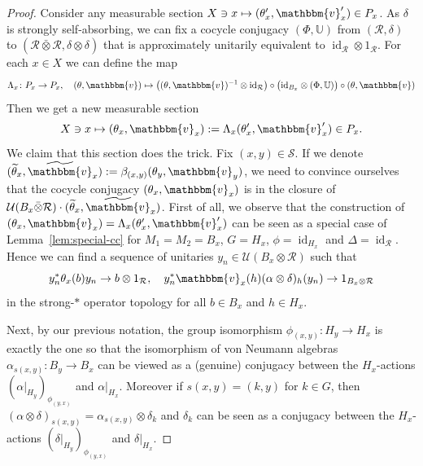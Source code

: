 \documentclass[11pt,a4paper]{article}
\theoremstyle{definition}
\theoremstyle{remark}
\numberwithin{equation}{section}
\numberwithin{theorem}{section}
\renewcommand{\tilde}{\widetilde}
\begin{document}
\begin{proof}
Consider any measurable section $X \ni x \mapsto (\theta'_x, \mathbbm{v}'_x) \in P_x$. 
As $\delta$ is strongly self-absorbing, we can fix a cocycle conjugacy $(\Phi, \mathbb{U})$ from $(\mathcal{R}, \delta)$ to $(\mathcal{R}\bar{\otimes} \mathcal{R}, \delta \otimes \delta)$ that is approximately unitarily equivalent to $\operatorname{id}_{\mathcal R}\otimes 1_{\mathcal R}$.
For each $x \in X$ we can define the map
\[
\Lambda_x\colon P_x \rightarrow P_x,\quad (\theta, \mathbbm{v}) \mapsto \big( (\theta, \mathbbm{v})^{-1} \otimes \mathrm{id}_\mathcal{R} \big) \circ \big( \mathrm{id}_{B_x} \otimes (\Phi, \mathbb{U}) \big) \circ (\theta, \mathbbm{v})
\]
Then we get a new measurable section
\[
X \ni x \mapsto (\theta_x, \mathbbm{v}_x) := \Lambda_x(\theta'_x, \mathbbm{v}'_x) \in P_x.
\]
We claim that this section does the trick. Fix $(x,y) \in \mathcal{S}$. 
If we denote $(\tilde{\theta}_x, \tilde{\mathbbm{v}}_x):= \beta_{(x,y)}(\theta_y, \mathbbm{v}_y)$, we need to convince ourselves that the cocycle conjugacy $(\theta_x, \mathbbm{v}_x)$ is in the closure of $\mathcal{U}(B_x \bar{\otimes}\mathcal{R})\cdot (\tilde{\theta}_x, \tilde{\mathbbm{v}}_x)$.
First of all, we observe that the construction of $(\theta_x, \mathbbm{v}_x)=\Lambda_x(\theta_x', \mathbbm{v}_x')$ can be seen as a special case of Lemma~\ref{lem:special-cc} for $M_1=M_2=B_x$, $G=H_x$, $\phi=\operatorname{id}_{H_x}$ and $\Delta=\operatorname{id}_{\mathcal R}$.
Hence we can find a sequence of unitaries $y_n\in\mathcal{U}(B_x\otimes\mathcal R)$ such that
\begin{equation} \label{eq:main-tech:yn}
y_n^*\theta_x(b)y_n \to b\otimes 1_{\mathcal R},\quad y_n^*\mathbbm{v}_x(h)(\alpha\otimes\delta)_h(y_n) \to 1_{B_x\otimes\mathcal R}
\end{equation}
in the strong-$*$ operator topology for all $b\in B_x$ and $h\in H_x$.

Next, by our previous notation, the group isomorphism $\phi_{(x,y)}\colon H_y\to H_x$ is exactly the one so that the isomorphism of von Neumann algebras $\alpha_{s(x,y)}\colon B_y\to B_x$ can be viewed as a (genuine) conjugacy between the $H_x$-actions $(\alpha|_{H_y})_{\phi_{(y,x)}}$ and $\alpha|_{H_x}$.
Moreover if $s(x,y)=(k,y)$ for $k\in G$, then $(\alpha\otimes\delta)_{s(x,y)}=\alpha_{s(x,y)}\otimes\delta_k$ and $\delta_k$ can be seen as a conjugacy between the $H_x$-actions $(\delta|_{H_y})_{\phi_{(y,x)}}$ and $\delta|_{H_x}$.


\end{proof}
\end{document}
